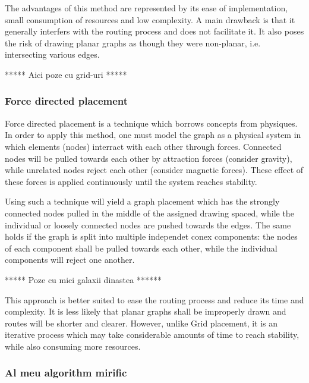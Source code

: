 The advantages of this method are represented by its ease of implementation, small consumption of resources and low complexity. A main drawback 
is that it generally interfers with the routing process and does not facilitate it. It also poses the risk of drawing planar graphs as though 
they were non-planar, i.e. intersecting various edges.


***** Aici poze cu grid-uri *****

\subsubsection{Force directed placement}

Force directed placement is a technique which borrows concepts from physiques. In order to apply this method, one must model the graph as a 
physical system in which elements (nodes) interract with each other through forces. Connected nodes will be pulled towards each other by 
attraction forces (consider gravity), while unrelated nodes reject each other (consider magnetic forces). These effect of these forces is 
applied continuously until the system reaches stability.

Using such a technique will yield a graph placement which has the strongly connected nodes pulled in the middle of the assigned drawing spaced, while the 
individual or loosely connected nodes are pushed towards the edges. The same holds if the graph is split into multiple independet conex components: 
the nodes of each component shall be pulled towards each other, while the individual components will reject one another.

***** Poze cu mici galaxii dinastea ******

This approach is better suited to ease the routing process and reduce its time and complexity. It is less likely that planar graphs shall be 
improperly drawn and routes will be shorter and clearer. However, unlike Grid placement, it is an iterative process which may take considerable 
amounts of time to reach stability, while also consuming more resources.

\subsubsection{Al meu algorithm mirific}
